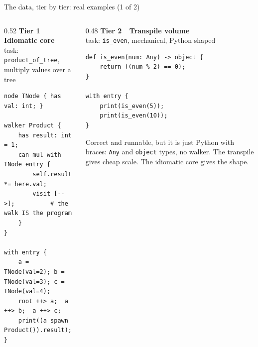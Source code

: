 \documentclass[aspectratio=169,11pt]{beamer}
\begin{document}
\begin{frame}[fragile]{The data, tier by tier: real examples (1 of 2)}
  \begin{columns}[t]
    \begin{column}{0.52\textwidth}
      \textbf{Tier 1 \,\textbullet\, Idiomatic core} \\
      {\scriptsize task: \texttt{product\_of\_tree}, multiply values over a tree}
      \begin{lstlisting}[style=code,language=Jac,basicstyle=\ttfamily\tiny\color{ink}]
node TNode { has val: int; }

walker Product {
    has result: int = 1;
    can mul with TNode entry {
        self.result *= here.val;
        visit [-->];          # the walk IS the program
    }
}

with entry {
    a = TNode(val=2); b = TNode(val=3); c = TNode(val=4);
    root ++> a;  a ++> b;  a ++> c;
    print((a spawn Product()).result);
}
      \end{lstlisting}
    \end{column}
    \begin{column}{0.48\textwidth}
      \textbf{Tier 2 \,\textbullet\, Transpile volume} \\
      {\scriptsize task: \texttt{is\_even}, mechanical, Python shaped}
      \begin{lstlisting}[style=code,language=Jac,basicstyle=\ttfamily\tiny\color{ink}]
def is_even(num: Any) -> object {
    return ((num % 2) == 0);
}

with entry {
    print(is_even(5));
    print(is_even(10));
}
      \end{lstlisting}
      \vspace{1mm}
      {\scriptsize Correct and runnable, but it is just Python with braces: \texttt{Any} and
       \texttt{object} types, no walker. The transpile gives cheap scale. The idiomatic core
       gives the shape.}
    \end{column}
  \end{columns}
\end{frame}
\end{document}
